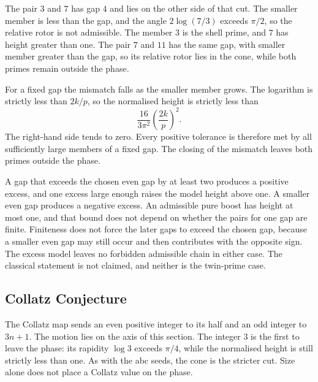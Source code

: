 \documentclass[a4paper]{article}
\theoremstyle{definition}
\theoremstyle{remark}
\begin{document}
The pair \(3\) and \(7\) has gap \(4\) and lies on the other side of that cut. The smaller member is less than the gap, and the angle \(2\log(7/3)\) exceeds \(\pi/2\), so the relative rotor is not admissible. The member \(3\) is the shell prime, and \(7\) has height greater than one. The pair \(7\) and \(11\) has the same gap, with smaller member greater than the gap, so its relative rotor lies in the cone, while both primes remain outside the phase.

For a fixed gap the mismatch falls as the smaller member grows. The logarithm is strictly less than \(2k/p\), so the normalised height is strictly less than
\[
\frac{16}{3\pi^2}\left(\frac{2k}{p}\right)^2.
\]
The right-hand side tends to zero. Every positive tolerance is therefore met by all sufficiently large members of a fixed gap. The closing of the mismatch leaves both primes outside the phase.

A gap that exceeds the chosen even gap by at least two produces a positive excess, and one excess large enough raises the model height above one. A smaller even gap produces a negative excess. An admissible pure boost has height at most one, and that bound does not depend on whether the pairs for one gap are finite. Finiteness does not force the later gaps to exceed the chosen gap, because a smaller even gap may still occur and then contributes with the opposite sign. The excess model leaves no forbidden admissible chain in either case. The classical statement is not claimed, and neither is the twin-prime case.

\subsection{Collatz Conjecture}

The Collatz map sends an even positive integer to its half and an odd integer to \(3n+1\). The motion lies on the axis of this section. The integer \(3\) is the first to leave the phase: its rapidity \(\log 3\) exceeds \(\pi/4\), while the normalised height is still strictly less than one. As with the abc seeds, the cone is the stricter cut. Size alone does not place a Collatz value on the phase.
\end{document}
